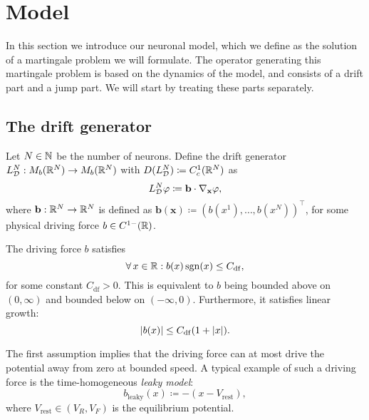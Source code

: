 \section{Model}

In this section we introduce our neuronal model, which we define as the solution of a martingale problem we will formulate.
The operator generating this martingale problem is based on the dynamics of the model, and consists of a drift part and a jump part.
We will start by treating these parts separately.

\subsection{The drift generator}

Let \( N \in \mathbb{N} \) be the number of neurons.
Define the drift generator \(L_{\mathcal{D}}^{N} : M_b(\mathbb{R}^N) \to M_b(\mathbb{R}^N)\) with \(D(L_{\mathcal{D}}^N) \coloneqq C_c^1(\mathbb{R}^N)\) as
\begin{equation}
  L_{\mathcal{D}}^{N}\varphi \coloneqq \mathbf{b} \cdot \nabla_{\mathbf{x}} \varphi,
\end{equation}
where \(\mathbf{b} : \mathbb{R}^N \to \mathbb{R}^N\) is defined as \( \bm{b}(\bm{x}) \coloneqq (b(x^1), \dots, b(x^N))^\top \), for some physical driving force \(b \in C^{1-}(\mathbb{R})\).
\begin{assumption}\label{assum:b-growth}
The driving force \( b \) satisfies
  \begin{equation}
    \forall x \in \potspace : b(x) \sgn(x) \leq C_\mathrm{df},
  \end{equation}
  for some constant \(C_\mathrm{df} > 0\).
  This is equivalent to \( b \) being bounded above on \( (0,\infty) \) and bounded below on \( (-\infty,0) \).
  Furthermore, it satisfies linear growth:
  \begin{equation}
    \lvert b(x)\rvert \leq C_\mathrm{df} (1 + \lvert x\rvert).
  \end{equation}
\end{assumption}
The first assumption implies that the driving force can at most drive the potential away from zero at bounded speed.
A typical example of such a driving force is the time-homogeneous \textit{leaky model}:
\begin{equation}
  b_{\mathrm{leaky}}(x) \coloneqq -(x - V_\mathrm{rest}),
\end{equation}
where \(V_\mathrm{rest} \in (V_R, V_F)\) is the equilibrium potential.

